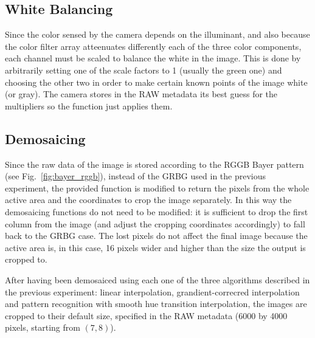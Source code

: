 \documentclass[a4paper,oneside]{article}
\begin{document}
\subsection{White Balancing}
Since the color sensed by the camera depends on the illuminant, and
also because the color filter array atteenuates differently each of
the three color components, each channel must be scaled to balance the
white in the image.
%
This is done by arbitrarily setting one of the scale factors to 1
(usually the green one) and choosing the other two in order to make
certain known points of the image white (or gray). The camera stores
in the RAW metadata its best guess for the multipliers so the
 function just applies them.

\subsection{Demosaicing}
Since the raw data of the image is stored according to the RGGB Bayer
pattern (see Fig.~\ref{fig:bayer_rggb}), instead of the GRBG used in
the previous experiment, the provided  function
is modified to return the pixels from the whole active area and the
coordinates to crop the image separately. In this way the demosaicing
functions do not need to be modified: it is sufficient to drop the
first column from the image (and adjust the cropping coordinates
accordingly) to fall back to the GRBG case. The lost pixels do not
affect the final image because the active area is, in this case, 16
pixels wider and higher than the size the output is cropped to.

After having been demosaiced using each one of the three algorithms
described in the previous experiment: linear interpolation,
grandient-correcred interpolation and pattern recognition with smooth
hue transition interpolation, the images are cropped to their default
size, specified in the RAW metadata (6000 by 4000 pixels, starting
from $(7,8)$).
\end{document}
